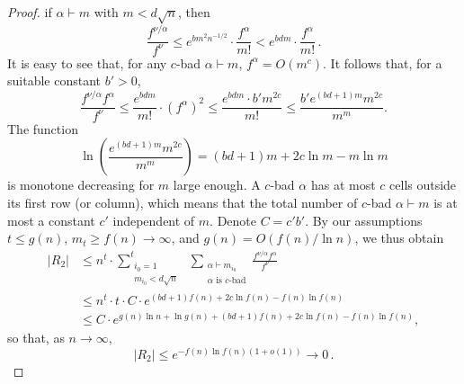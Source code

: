\documentclass[12pt]%
{amsart}
\newcommand{\al}{{\alpha}}
\def\red#1{{\color{red}{#1}}}
\theoremstyle{plain}
\theoremstyle{definition}
\theoremstyle{remark}
\newcommand{\ve}{\varepsilon}
\begin{document}
\begin{proof}
if $\al \vdash m$ with $m < d \sqrt n$, then
\[
    \frac{f^{\nu/\al}}{f^\nu} 
    \le e^{b m^{2} n^{-1/2}} \cdot \frac{f^\al}{m!}
    < e^{b d m} \cdot \frac{f^\al}{m!} \, .
\]  
It is easy to see that, for any $c$-bad $\al \vdash m$, $f^\al = O(m^c)$. 
It follows that, for a suitable constant $b' > 0$,
\[
    \frac{f^{\nu/\al} f^\al}{f^\nu} 
    \le \frac{e^{b d m}}{m!} \cdot (f^\al)^2
    \le \frac{e^{b d m}\cdot b' m^{2c}}{m!}
    \le\frac{b'e^{(b d+1)m}m^{2c}} {m^m}.
\]
The function
\[
    \ln\left(\frac{e^{(b d+1)m}m^{2c}} {m^m}\right)
    =(bd+1)m+2c\ln m-m\ln m
\]
is monotone decreasing for $m$ large enough.
A $c$-bad $\al$ has at most $c$ cells outside its first row (or column), which means that the total number of $c$-bad $\al \vdash m$ is at most a constant $c'$  independent of $m$. Denote $C=c'b'$.
By our assumptions $t \le g(n)$, $m_t \ge f(n) \to \infty$, and $g(n) = O(f(n) / \ln n)$, we thus obtain
\begin{align}\label{eq:fromR2}
    |R_2| 
    &\le n^{t} \cdot
    \sum_{\substack{i_0 = 1 \\ m_{i_0} < d \sqrt n}}^{t} \,\,\sum_{\substack{\al \vdash m_{i_0} \\ \al \text{ is $c$-bad}}}
    \frac{f^{\nu/\al} f^\al}{f^\nu} \nonumber\\
    &\le n^t \cdot t \cdot C \cdot 
   e^{(b d + 1) f(n) + 2c\ln f(n) - f(n) \ln f(n) } \\
    &\le C \cdot e^{g(n)\ln n+\ln g(n)
    +(b d + 1) f(n) + 2c\ln f(n) - f(n) \ln f(n) } ,\nonumber
\end{align}
so that, as $n \to \infty$,
\begin{equation}\label{eq:R2}
    |R_2| \le e^{-f(n)\ln f(n)(1+o(1))} \to 0 \,.  
\end{equation}




\end{proof}
\end{document}
